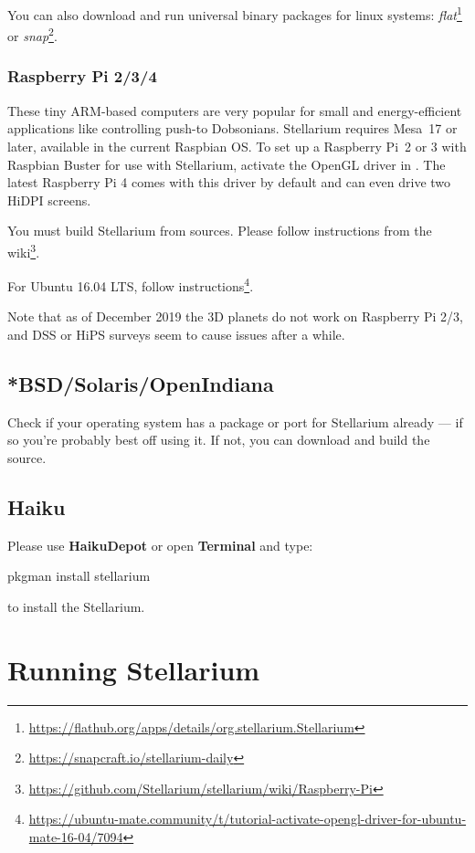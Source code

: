 You can also download and run universal binary packages for linux systems:  \emph{flat}\footnote{\url{https://flathub.org/apps/details/org.stellarium.Stellarium}} or \emph{snap}\footnote{\url{https://snapcraft.io/stellarium-daily}}.

\subsubsection{Raspberry Pi 2/3/4}
These tiny ARM-based computers are very popular for small and energy-efficient applications like controlling push-to Dobsonians. 
Stellarium requires Mesa~17 or later, available in the current Raspbian OS. 
To set up a Raspberry Pi~2 or 3 with Raspbian Buster for use with Stellarium, activate the OpenGL driver in 
. The latest Raspberry Pi 4 comes with this driver by default and can even drive two HiDPI screens.

You must build Stellarium from sources. Please follow instructions from the wiki\footnote{\url{https://github.com/Stellarium/stellarium/wiki/Raspberry-Pi}}.

For Ubuntu 16.04 LTS, follow instructions\footnote{\url{https://ubuntu-mate.community/t/tutorial-activate-opengl-driver-for-ubuntu-mate-16-04/7094}}. 
	
Note that as of December 2019 the 3D planets do not work on Raspberry Pi 2/3, and DSS or HiPS surveys seem to cause issues after a while.

\subsection{*BSD/Solaris/OpenIndiana}
\label{sec:GettingStarted:Installation:UNIX}

Check if your operating system has a package or port for Stellarium already --- 
if so you're probably best off using it. If not, you can download and build
the source.

\subsection{Haiku}
\label{sec:GettingStarted:Installation:Haiku}

Please use \textbf{HaikuDepot} or open \textbf{Terminal} and type:
\begin{commands}
pkgman install stellarium
\end{commands}
to install the Stellarium.

\section{Running Stellarium}
\label{sec:GettingStarted:Running}

